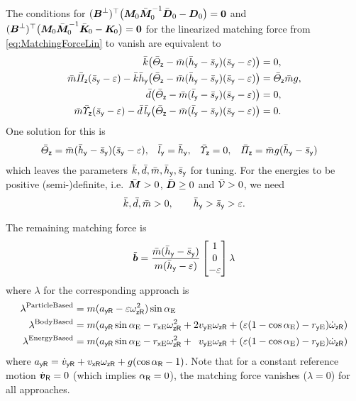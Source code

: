 The conditions for $(\sysInputMatLComp)^\top \big( \sysInertiaMatLin \sysInertiaMatCLin^{-1} \sysDissMatCLin - \sysDissMatLin\big) = \mat{0}$ and $(\sysInputMatLComp)^\top \big( \sysInertiaMatLin \sysInertiaMatCLin^{-1} \sysStiffMatCLin - \sysStiffMatLin\big) = \mat{0}$ for the linearized matching force from \eqref{eq:MatchingForceLin} to vanish are equivalent to
\begin{subequations}\label{eq:PVTOLMatchingCondLin}
\begin{align}
 \kc \big( \Jcz - \mc(\hcy - \scy)(\scy - \eps) \big) &= 0,
\\
 \mc \kapcz (\scy-\eps) - \kc\hcy \big( \Jcz - \mc (\hcy - \scy)(\scy - \eps) \big) &= \Jcz \mc \gravityAccConst, 
\\
 \dc \big( \Jcz - \mc(\lcy - \scy)(\scy - \eps) \big) &= 0,
\\
 \mc \sigcz (\scy-\eps) - \dc\,\lcy \big( \Jcz - \mc (\lcy - \scy)(\scy - \eps) \big) &= 0.
\end{align}
\end{subequations}
One solution for this is
\begin{align}\label{eq:PVTOLMatchingSolution}
 \Jcz &= \mc(\hcy - \scy)(\scy - \eps),&
 \lcy &= \hcy,&
 \sigcz &= 0,&
 \kapcz &= \mc \gravityAccConst (\hcy-\scy)
\end{align}
which leaves the parameters $\kc, \dc, \mc, \hcy, \scy$ for tuning.
For the energies to be positive (semi-)definite, i.e.\ $\sysInertiaMatC > 0$, $\sysDissMatC \geq 0$ and $\potentialEnergyC > 0$, we need
\begin{align}
 \kc, \dc, \mc > 0, \qquad \hcy > \scy > \eps.
\end{align}

The remaining matching force is
\begin{align}
 \tilde{\sysForce} = \frac{\mc(\hcy-\scy)}{m(\hcy-\eps)} \begin{bmatrix} 1 \\ 0 \\ -\eps \end{bmatrix} \lambda
\end{align}
where $\lambda$ for the corresponding approach is
\begin{subequations}
\begin{align}
 \lambda^{\text{ParticleBased}} &= m(a_{\idxY\idxRef} - \eps\wzR^2)\sin\tiltAngleE
\\
 \lambda^{\text{BodyBased}} &= m(a_{\idxY\idxRef}\sin\tiltAngleE - \rxE\wzR^2 + 2\vyE\wzR + (\eps(1-\cos\tiltAngleE)-\ryE)\wzRd)
\\
 \lambda^{\text{EnergyBased}} &= m(a_{\idxY\idxRef}\sin\tiltAngleE - \rxE\wzR^2 +\phantom{2}\vyE\wzR + (\eps(1-\cos\tiltAngleE)-\ryE)\wzRd)
\end{align} 
\end{subequations}
where $a_{\idxY\idxRef} = \vyRd + \vxR\wzR + \gravityAccConst(\cos\tiltAngleR - 1)$. 
Note that for a constant reference motion $\vRd = 0$ (which implies $\tiltAngleR = 0$), the matching force vanishes ($\lambda = 0$) for all approaches.


